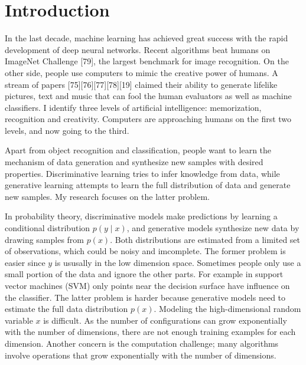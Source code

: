 \documentclass{article}
\begin{document}
\section{Introduction}
\label{Sec:Intro}

In the last decade, machine learning has achieved great success with the rapid development of deep neural networks. Recent algorithms beat humans on ImageNet Challenge [79], the largest benchmark for image recognition. On the other side, people use computers to mimic the creative power of humans. A stream of papers [75][76][77][78][19] claimed their ability to generate lifelike pictures, text and music that can fool the human evaluators as well as machine classifiers. I identify three levels of artificial intelligence: memorization, recognition and creativity. Computers are approaching humans on the first two levels, and now going to the third.

Apart from object recognition and classification, people want to learn the mechanism of data generation and synthesize new samples with desired properties. Discriminative learning tries to infer knowledge from data, while generative learning attempts to learn the full distribution of data and generate new samples. My research focuses on the latter problem.

In probability theory, discriminative models make predictions by learning a conditional distribution $p(y\mid x)$, and generative models synthesize new data by drawing samples from $p(x)$. Both distributions are estimated from a limited set of observations, which could be noisy and imcomplete. The former problem is easier since $y$ is ususally in the low dimension space. Sometimes people only use a small portion of the data and ignore the other parts. For example in support vector machines (SVM) only points near the decision surface have influence on the classifier. The latter problem is harder because generative models need to estimate the full data distribution $p(x)$. Modeling the high-dimensional random variable $x$ is difficult. As the number of configurations can grow exponentially with the number of dimensions, there are not enough training examples for each dimension. Another concern is the computation challenge; many algorithms involve operations that grow exponentially with the number of dimensions.
\end{document}
